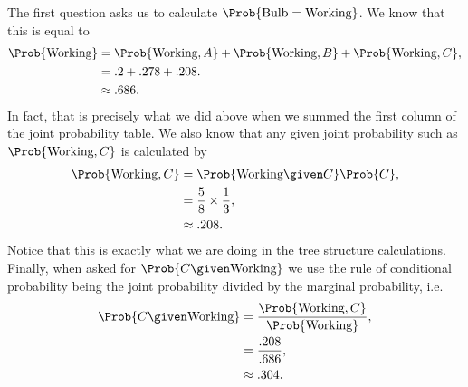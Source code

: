 \documentclass{mjandrews.notes.palatino}
\begin{document}
The first question asks us to calculate $\Prob{\text{Bulb}=\text{Working}}$. We know that this is equal to 
\begin{align*}
\Prob{\text{Working}} &= \Prob{\text{Working},A} + \Prob{\text{Working}, B} + \Prob{\text{Working},C},\\
&= .2 + .278 + .208.\\
&\approx .686.
\end{align*}
In fact, that is precisely what we did above when we summed the first column of the joint probability table. We also know that any given joint probability such as $\Prob{\text{Working},C}$ is calculated by 
\begin{align*}
\Prob{\text{Working},C} &= \Prob{\text{Working}\given C} \Prob{C},\\
&=  \frac{5}{8} \times \frac{1}{3},\\
&\approx .208.
\end{align*}
Notice that this is exactly what we are doing in the tree structure calculations. Finally, when asked for $\Prob{C\given\text{Working}}$ we use the rule of conditional probability being the joint probability divided by the marginal probability, i.e. 
\begin{align*}
\Prob{C\given\text{Working}} &= \frac{\Prob{\text{Working},C}}{\Prob{\text{Working}}},\\
&= \frac{.208}{.686},\\
&\approx .304.
\end{align*}
\end{document}
